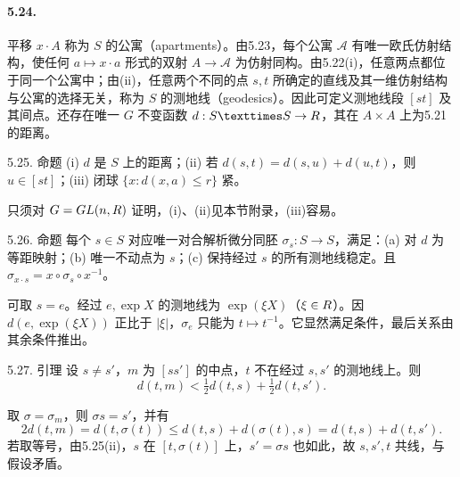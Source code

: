 \paragraph*{5.24.} 平移 $x\cdot A$ 称为 $S$ 的公寓（apartments）。由5.23，每个公寓 $\mathcal A$ 有唯一欧氏仿射结构，使任何 $a\mapsto x\cdot a$ 形式的双射 $A\to\mathcal A$ 为仿射同构。由5.22(i)，任意两点都位于同一个公寓中；由(ii)，任意两个不同的点 $s,t$ 所确定的直线及其一维仿射结构与公寓的选择无关，称为 $S$ 的测地线（geodesics）。因此可定义测地线段 $[st]$ 及其间点。还存在唯一 $G$ 不变函数 $d:S\times S\to\R$，其在 $A\times A$ 上为5.21的距离。
\begin{originaltheorem}{5.25. 命题}
(i) $d$ 是 $S$ 上的距离；(ii) 若 $d(s,t)=d(s,u)+d(u,t)$，则 $u\in[st]$；(iii) 闭球 $\{x:d(x,a)\le r\}$ 紧。
\end{originaltheorem}
只须对 $G=GL(n,R)$ 证明，(i)、(ii)见本节附录，(iii)容易。
\begin{originaltheorem}{5.26. 命题}
每个 $s\in S$ 对应唯一对合解析微分同胚 $\sigma_s:S\to S$，满足：(a) 对 $d$ 为等距映射；(b) 唯一不动点为 $s$；(c) 保持经过 $s$ 的所有测地线稳定。且 $\sigma_{x\cdot s}=x\circ\sigma_s\circ x^{-1}$。
\end{originaltheorem}
可取 $s=e$。经过 $e,\exp X$ 的测地线为 $\exp(\xi X)$（$\xi\in R$）。因 $d(e,\exp(\xi X))$ 正比于 $|\xi|$，$\sigma_e$ 只能为 $t\mapsto t^{-1}$。它显然满足条件，最后关系由其余条件推出。
\begin{originaltheorem}{5.27. 引理}
设 $s\ne s'$，$m$ 为 $[ss']$ 的中点，$t$ 不在经过 $s,s'$ 的测地线上。则
\[
 d(t,m)<\tfrac12d(t,s)+\tfrac12d(t,s').
\]
\end{originaltheorem}
取 $\sigma=\sigma_m$，则 $\sigma s=s'$，并有
\[
 2d(t,m)=d(t,\sigma(t))\le d(t,s)+d(\sigma(t),s)=d(t,s)+d(t,s').
\]
若取等号，由5.25(ii)，$s$ 在 $[t,\sigma(t)]$ 上，$s'=\sigma s$ 也如此，故 $s,s',t$ 共线，与假设矛盾。

